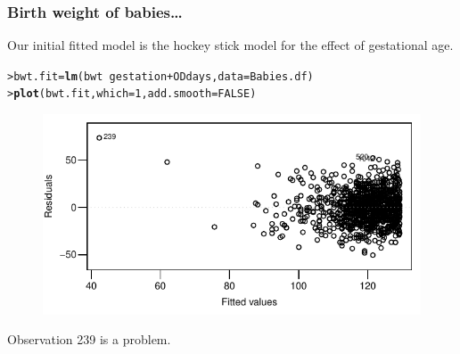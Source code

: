\documentclass{beamer}\usepackage[]{graphicx}\usepackage[]{xcolor}
\makeatletter
\newcommand{\hlnum}[1]{\textcolor[rgb]{0.686,0.059,0.569}{#1}}%
\newcommand{\hlopt}[1]{\textcolor[rgb]{0,0,0}{#1}}%
\newcommand{\hlstd}[1]{\textcolor[rgb]{0.345,0.345,0.345}{#1}}%
\newcommand{\hlkwb}[1]{\textcolor[rgb]{0.69,0.353,0.396}{#1}}%
\newcommand{\hlkwc}[1]{\textcolor[rgb]{0.333,0.667,0.333}{#1}}%
\newcommand{\hlkwd}[1]{\textcolor[rgb]{0.737,0.353,0.396}{\textbf{#1}}}%
\newenvironment{kframe}{%
 \def\at@end@of@kframe{}%
 \ifinner\ifhmode%
  \def\at@end@of@kframe{\end{minipage}}%
  \begin{minipage}{\columnwidth}%
 \fi\fi%
 \def\FrameCommand##1{\hskip\@totalleftmargin \hskip-\fboxsep
 \colorbox{shadecolor}{##1}\hskip-\fboxsep
     \hskip-\linewidth \hskip-\@totalleftmargin \hskip\columnwidth}%
 \MakeFramed {\advance\hsize-\width
   \@totalleftmargin\z@ \linewidth\hsize
   \@setminipage}}%
 {\par\unskip\endMakeFramed%
 \at@end@of@kframe}
\newenvironment{knitrout}{}{} %
\makeatother
\begin{document}
\begin{frame}[fragile]
\frametitle{Birth weight of babies\ldots}
Our initial fitted model is the hockey stick model for the effect of gestational age.
\begin{knitrout}\scriptsize
{}\color{fgcolor}\begin{kframe}
\begin{alltt}
\hlstd{> }\hlstd{bwt.fit}\hlkwb{=}\hlkwd{lm}\hlstd{(bwt}\hlopt{~} \hlstd{gestation}\hlopt{+}\hlstd{ODdays,} \hlkwc{data} \hlstd{= Babies.df)}
\hlstd{> }\hlkwd{plot}\hlstd{(bwt.fit,} \hlkwc{which} \hlstd{=} \hlnum{1}\hlstd{,} \hlkwc{add.smooth} \hlstd{=} \hlnum{FALSE}\hlstd{)}
\end{alltt}
\end{kframe}
\end{knitrout}


\begin{figure}
  \centering
  \includegraphics{figure/RC-H10-020}
\end{figure}

Observation 239 is a problem.
\end{frame}
\end{document}
